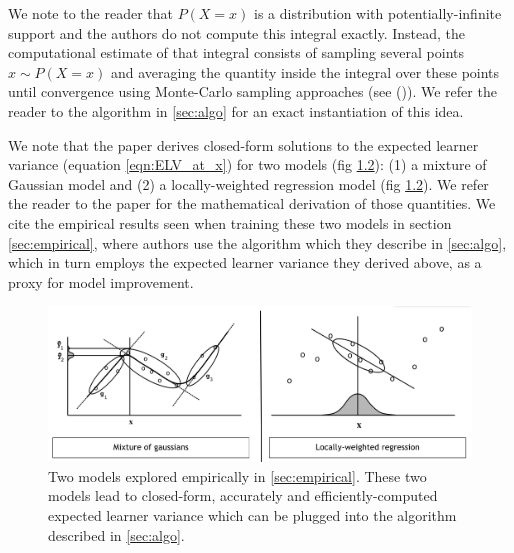 \documentclass[
  letterpaper,
  DIV=11,
  numbers=noendperiod,
  oneside]{scrreprt}
\theoremstyle{remark}
\begin{document}
We note to the reader that \(P(X=x)\) is a distribution with
potentially-infinite support and the authors do not compute this
integral exactly. Instead, the computational estimate of that integral
consists of sampling several points \(x \sim P(X=x)\) and averaging the
quantity inside the integral over these points until convergence using
Monte-Carlo sampling approaches (see ()). We refer the reader to the algorithm in
\hyperref[sec:algo]{{[}sec:algo{]}} for an exact instantiation of this
idea.

We note that the paper derives closed-form solutions to the expected
learner variance (equation
\hyperref[eqn:ELV_at_x]{{[}eqn:ELV\_at\_x{]}}) for two models (fig
\hyperref[fig:two_models]{1.2}): (1) a mixture of Gaussian model and (2)
a locally-weighted regression model (fig
\hyperref[fig:two_models]{1.2}). We refer the reader to the paper for
the mathematical derivation of those quantities. We cite the empirical
results seen when training these two models in section
\hyperref[sec:empirical]{{[}sec:empirical{]}}, where authors use the
algorithm which they describe in \hyperref[sec:algo]{{[}sec:algo{]}},
which in turn employs the expected learner variance they derived above,
as a proxy for model improvement.

\label{sec:two_models}{}

\begin{figure}

{\centering \includegraphics[width=1\textwidth,height=\textheight]{src/Figures/1_two_models.png}

}

\caption{Two models explored empirically in
\hyperref[sec:empirical]{{[}sec:empirical{]}}. These two models lead to
closed-form, accurately and efficiently-computed expected learner
variance which can be plugged into the algorithm described in
\hyperref[sec:algo]{{[}sec:algo{]}}.}

\end{figure}%
\end{document}
